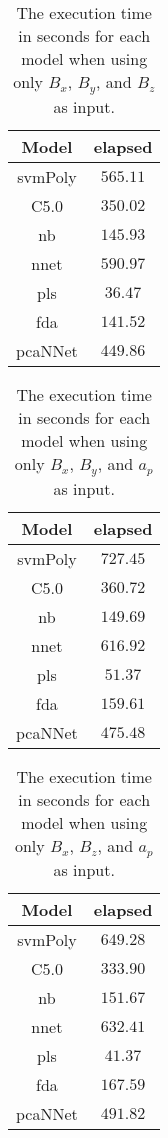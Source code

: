 \begin{table}[!ht]
	\centering
	\begin{tabular}{|c|c|}
		\hline
		Model & elapsed \\ \hline
		svmPoly & $565.11$ \\ \hline
		C5.0 & $350.02$ \\ \hline
		nb & $145.93$ \\ \hline
		nnet & $590.97$ \\ \hline
		pls & $36.47$ \\ \hline
		fda & $141.52$ \\ \hline
		pcaNNet & $449.86$ \\ \hline
	\end{tabular}
	\caption{The execution time in seconds for each model when using only $B_{x}$, $B_{y}$, and $B_{z}$ as input.}
	\label{tab:time:coord:total}
\end{table}

\begin{table}[!ht]
	\centering
	\begin{tabular}{|c|c|}
		\hline
		Model & elapsed \\ \hline
		svmPoly & $727.45$ \\ \hline
		C5.0 & $360.72$ \\ \hline
		nb & $149.69$ \\ \hline
		nnet & $616.92$ \\ \hline
		pls & $51.37$ \\ \hline
		fda & $159.61$ \\ \hline
		pcaNNet & $475.48$ \\ \hline
	\end{tabular}
	\caption{The execution time in seconds for each model when using only $B_{x}$, $B_{y}$, and $a_{p}$ as input.}
	\label{tab:time:xyap:total}
\end{table}

\begin{table}[!ht]
	\centering
	\begin{tabular}{|c|c|}
		\hline
		Model & elapsed \\ \hline
		svmPoly & $649.28$ \\ \hline
		C5.0 & $333.90$ \\ \hline
		nb & $151.67$ \\ \hline
		nnet & $632.41$ \\ \hline
		pls & $41.37$ \\ \hline
		fda & $167.59$ \\ \hline
		pcaNNet & $491.82$ \\ \hline
	\end{tabular}
	\caption{The execution time in seconds for each model when using only $B_{x}$, $B_{z}$, and $a_{p}$ as input.}
	\label{tab:time:xzap:total}
\end{table}

